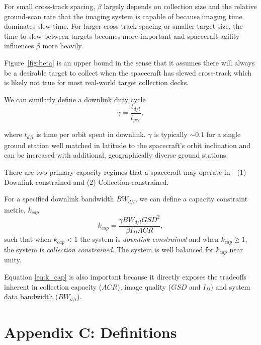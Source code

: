 \documentclass[]{spieman}  %
\begin{document}
For small cross-track spacing, $\beta$ largely depends on collection size and the relative ground-scan rate that the imaging system is capable of because imaging time dominates slew time.  For larger cross-track spacing or smaller target size, the time to slew between targets becomes more important and spacecraft agility influences $\beta$ more heavily.

Figure~\ref{fig:beta} is an upper bound in the sense that it assumes there will always be a desirable target to collect when the spacecraft has slewed cross-track which is likely not true for most real-world target collection decks.  

We can similarly define a downlink duty cycle
\begin{equation}
    \gamma = \frac{t_{d/l}}{t_{per}},
\end{equation}

where $t_{d/l}$ is time per orbit spent in downlink.  $\gamma$ is typically $\sim 0.1$ for a single ground station well matched in latitude to the spacecraft's orbit inclination and can be increased with additional, geographically diverse ground stations.

There are two primary capacity regimes that a spacecraft may operate in - (1) Downlink-constrained and (2) Collection-constrained.

For a specified downlink bandwidth $BW_{d/l}$, we can define a capacity constraint metric, $k_{cap}$
\begin{equation}
\label{eq:k_cap}
k_{cap} = \frac{\gamma BW_{d/l} GSD^2}{\beta I_D ACR},
\end{equation}
such that when $k_{cap} < 1$ the system is \emph{downlink constrained} and when $k_{cap} \geq 1$, the system is \emph{collection constrained}.  The system is well balanced for $k_{cap}$ near unity.  

Equation \eqref{eq:k_cap} is also  important because it directly exposes the tradeoffs inherent in collection capacity ($ACR$), image quality ($GSD$ and $I_D$) and system data bandwidth ($BW_{d/l}$).

\section{Appendix C: Definitions}
\label{sec:appendix_c}

\end{document}
